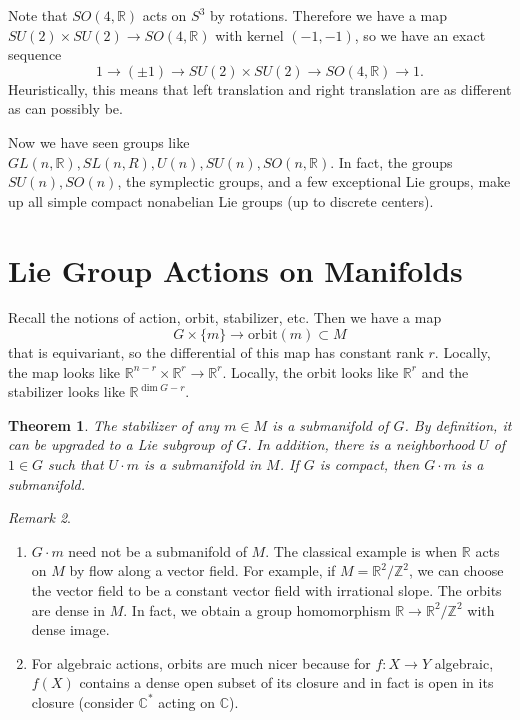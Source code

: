 \documentclass[leqno, openany]{memoir}
\newtheorem{thm}{Theorem}[section]
\theoremstyle{definition}
\theoremstyle{remark}
\newtheorem{rmk}[thm]{Remark}
\theoremstyle{plain}
\theoremstyle{definition}
\theoremstyle{remark}
\newcommand{\R}{\mathbb{R}}
\newcommand{\C}{\mathbb{C}}
\newcommand{\Z}{\mathbb{Z}}
\newcommand{\mr}[1]{\mathrm{#1}}
\begin{document}
Note that $SO(4,\R)$ acts on $S^3$ by rotations. Therefore we have a map $SU(2) \times SU(2) \to SO(4, \R)$ with kernel $(-1, -1)$, so we have an exact sequence
\[ 1 \to (\pm 1) \to SU(2) \times SU(2) \to SO(4,\R) \to 1. \]
Heuristically, this means that left translation and right translation are as different as can possibly be.

Now we have seen groups like $GL(n, \R), SL(n,R), U(n), SU(n), SO(n,\R)$. In fact, the groups $SU(n), SO(n)$, the symplectic groups, and a few exceptional Lie groups, make up all simple compact nonabelian Lie groups (up to discrete centers).

\section{Lie Group Actions on Manifolds}%
\label{sec:lie_group_actions_on_manifolds}

Recall the notions of action, orbit, stabilizer, etc. Then we have a map
\[ G \times \{m \} \to \mr{orbit}(m) \subset M \]
that is equivariant, so the differential of this map has constant rank $r$. Locally, the map looks like $\R^{n-r} \times \R^r \to \R^r$. Locally, the orbit looks like $\R^r$ and the stabilizer looks like $\R^{\dim G - r}$.

\begin{thm}
    The stabilizer of any $m \in M$ is a submanifold of $G$. By definition, it can be upgraded to a Lie subgroup of $G$. In addition, there is a neighborhood $U$ of $1 \in G$ such that $U \cdot m$ is a submanifold in $M$. If $G$ is compact, then $G \cdot m$ is a submanifold.
\end{thm}

\begin{rmk}
    \begin{enumerate}
        \item $G \cdot m$ need not be a submanifold of $M$. The classical example is when $\R$ acts on $M$ by flow along a vector field. For example, if $M = \R^2 / \Z^2$, we can choose the vector field to be a constant vector field with irrational slope. The orbits are dense in $M$. In fact, we obtain a group homomorphism $\R \to \R^2 / \Z^2$ with dense image.
        \item For algebraic actions, orbits are much nicer because for $f: X \to Y$ algebraic, $f(X)$ contains a dense open subset of its closure and in fact is open in its closure (consider $\C^*$ acting on $\C$). 
    \end{enumerate}
\end{rmk}
\end{document}
